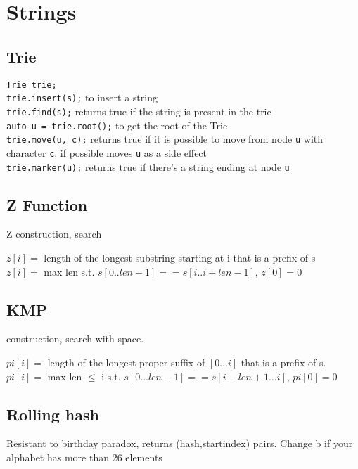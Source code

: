 \section{Strings}


\subsection{Trie}
\verb|Trie trie;| \\
\verb|trie.insert(s);|
to insert a string \\
\verb|trie.find(s);|
returns true if the string is present in the trie \\
\verb|auto u = trie.root();|
to get the root of the Trie \\
\verb|trie.move(u, c);|
returns true if it is possible to move from node \verb|u| with character \verb|c|,
if possible moves \verb|u| as a side effect \\
\verb|trie.marker(u);|
returns true if there's a string ending at node \verb|u| \\


\subsection{Z Function}
 Z construction,  search

\begin{flushleft}
$z[i] = $ length of the longest substring starting at i that is a prefix of s \\
$z[i] = $ max len s.t. $s[0..len-1] == s[i..i+len-1]$, $z[0] = 0$

\end{flushleft}

\subsection{KMP}
 construction,  search with  space.

$pi[i] =$ length of the longest proper suffix of $[0 \ldots i]$ that is a prefix of s. \\
$pi[i] =$ max len $\leq$ i s.t. $s[0\ldots len-1] == s[i-len+1 \ldots i]$, $pi[0]=0$

\subsection{Rolling hash}
Resistant to birthday paradox, returns (hash,startindex) pairs. Change b if your alphabet has more than 26 elements

